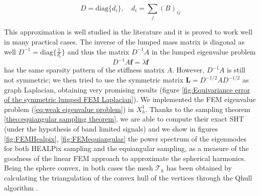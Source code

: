 \begin{equation}\label{eq:lumping}
D = \text{diag}\{d_i\},\quad d_i = \sum_j (B)_{ij}
\end{equation}

This approximation is well studied in the literature and it is proved to work well in many practical cases. The inverse of the lumped mass matrix is diagonal as well $D^{-1} = \text{diag}\{\frac{1}{d_i}\}$ and thus the matrix $D^{-1}A$ in the lumped eigenvalue problem 
\begin{equation}\label{eq:lumped eigenvalue problem}
	D^{-1}A\mathbf f = \lambda \mathbf f
\end{equation}
has the same sparsity pattern of the stiffness matrix $A$. However, $D^{-1}A$ is still not symmetric; we then tried to use the symmetric matrix $\mathbf L = D^{-1/2}AD^{-1/2}$ as graph Laplacian, obtaining very promising results (figure \ref{fig:Equivariance error of the symmetric lumped FEM Laplacian}).
We implemented the FEM eigenvalue problem (\ref{eq:weak eigenvalue problem}) in $X_h^1$. Thanks to the sampling theorem \ref{theo:equiangular sampling theorem}, we are able to compute their exact SHT (under the hypothesis of band limited signals) and we show in figures \ref{fig:FEMHealpix}, \ref{fig:FEMequiangular} the power spectrum of the eigenmodes for both HEALPix sampling and the equiangular sampling, as a measure of the goodness of the linear FEM approach to approximate the spherical harmonics. Being the sphere convex, in both cases the mesh $\mathcal T_h$ has been obtained by calculating the triangulation of the convex hull of the vertices through the Qhull algorithm \cite{Barber96thequickhull}.

